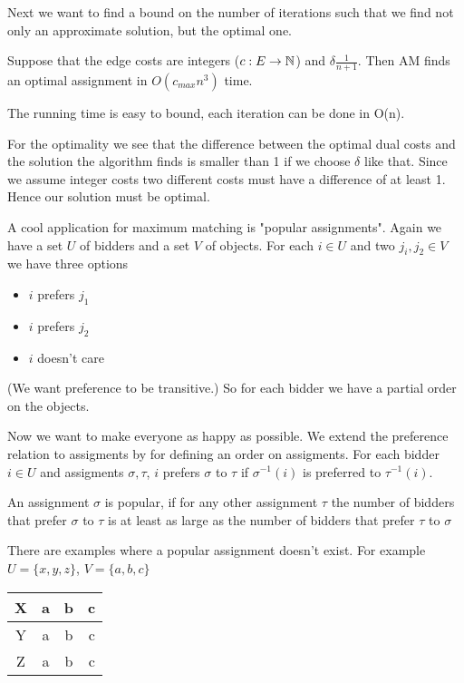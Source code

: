 Next we want to find a bound on the number of iterations such that we find not only an approximate solution, but the optimal one.

\begin{thm} Suppose that the edge costs are integers ($c:E\rightarrow \mathbb{N}$) and $\delta \frac{1}{n+1}$. Then AM finds an optimal assignment in $O(c_{max}n^3)$ time.
\end{thm}

\begin{pr} The running time is easy to bound, each iteration can be done in O(n).

For the optimality we see that the difference between the optimal dual costs and the solution the algorithm finds is smaller than 1 if we choose $\delta$ like that. Since we assume integer costs two different costs must have a difference of at least 1. Hence our solution must be optimal.
\end{pr}

A cool application for maximum matching is "popular assignments". Again we have a set $U$ of bidders and a set $V$ of objects. For each $i\in U$ and two $j_i,j_2\in V$ we have three options

\begin{itemize}
\item $i$ prefers $j_1$
\item $i$ prefers $j_2$
\item $i$ doesn't care
\end{itemize}

(We want preference to be transitive.) So for each bidder we have a partial order on the objects.

Now we want to make everyone as happy as possible. We extend the preference relation to assigments by for defining an order on assigments. For each bidder $i\in U$ and assigments $\sigma,\tau$, $i$ prefers $\sigma$ to $\tau$ if $\sigma^{-1}(i)$ is preferred to $\tau^{-1}(i)$.

\begin{Def} An assignment $\sigma$ is popular, if for any other assignment $\tau$ the number of bidders that prefer $\sigma$ to $\tau$ is at least as large as the number of bidders that prefer $\tau$ to $\sigma$
\end{Def}

There are examples where a popular assignment doesn't exist. For example $U=\{x,y,z\}$, $V = \{a,b,c\}$

\begin{center}
\begin{tabular}{c|ccc}
X & \cellcolor{gruen} a & b & \cellcolor{rot}c\\\hline
Y & a & \cellcolor{rot}b & \cellcolor{gruen}c\\\hline
Z & \cellcolor{rot}a & \cellcolor{gruen}b & c\\
\end{tabular}
\end{center}

